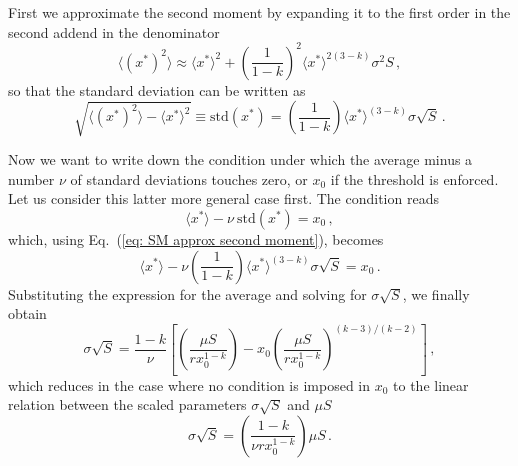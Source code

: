 \documentclass[10pt]{article}
\begin{document}
First we approximate the second moment by expanding it
to the first order in the second addend in the denominator
\begin{equation}
    \langle (x^*)^2 \rangle \approx \langle x^* \rangle^2
    + \left(\frac{1}{1-k}\right)^2\langle x^* \rangle^{2(3-k)}\sigma^2 S \, ,
\end{equation}
so that the standard deviation can be written as
\begin{equation}
    \sqrt{\langle (x^*)^2 \rangle - \langle x^* \rangle^2} \equiv \textrm{std}(x^*)=
    \left(\frac{1}{1-k}\right)\langle x^* \rangle^{(3-k)}\sigma \sqrt{S} \, .
\label{eq: SM approx second moment}
\end{equation}

Now we want to write down the condition under which
the average minus a number $\nu$ of standard deviations
touches zero, or $x_0$ if the threshold is enforced.
Let us consider this latter more general case first.
The condition reads
\begin{equation}
    \langle x^*\rangle - \nu \ \textrm{std}(x^*)
    = x_0 \, ,
\label{eq: SM extinction condition}
\end{equation}
which, using Eq.~(\ref{eq: SM approx second moment}),
becomes
\begin{equation}
    \langle x^*\rangle - \nu\left(\frac{1}{1-k}\right)\langle x^* \rangle^{(3-k)}\sigma \sqrt{S}
    = x_0 \, .
\end{equation}
Substituting the expression for the average and solving for
$\sigma\sqrt{S}$, we finally obtain
\begin{equation}
    \sigma\sqrt{S} = \frac{1-k}{\nu}\left[\left(\frac{ \mu S}{rx_0^{1-k}}\right)
    -x_0\left(\frac{ \mu S}{rx_0^{1-k}}\right)^{(k-3)/(k-2)}\right] \, ,
    \label{eq: SM extinction line threshold}
\end{equation}
which reduces in the case where no condition is imposed in $x_0$
to the linear relation between the scaled parameters
$\sigma\sqrt{S}$ and $\mu S$
\begin{equation}
    \sigma\sqrt{S} = \left(\frac{1-k}{\nu rx_0^{1-k}}\right)\mu S \, .
    \label{eq: SM extinction line no threhsold}
\end{equation}
\end{document}
